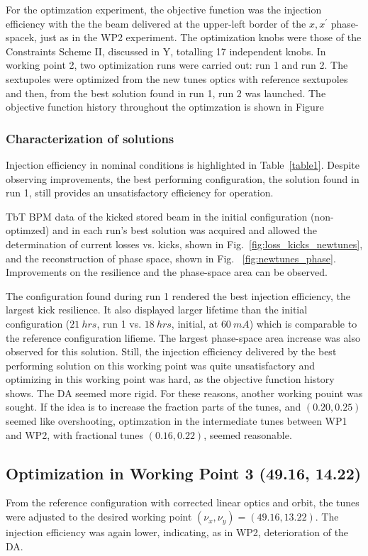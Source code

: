 For the optimzation experiment, the objective function was the injection efficiency with the the beam delivered at the upper-left border of the $x,x^\prime$ phase-spacek, just as in the WP2 experiment. The optimization knobs were those of the Constraints Scheme II, discussed in Y, totalling 17 independent knobs. In working point 2, two optimization runs were carried out: run 1 and run 2. The sextupoles were optimized from the new tunes optics with reference sextupoles and then, from the best solution found in run 1, run 2 was launched. The objective function history throughout the optimzation is shown in Figure
\subsubsection{Characterization of solutions}
Injection efficiency in nominal conditions is highlighted in Table~\ref{table1}. Despite observing improvements, the best performing configuration, the solution found in run 1, still provides an unsatisfactory efficiency for operation.

TbT BPM data of the kicked stored beam  in the initial configuration (non-optimzed) and in each run's best solution was acquired and allowed the determination of current losses vs. kicks, shown in Fig.~\ref{fig:loss_kicks_newtunes}, and the reconstruction of phase space, shown in Fig. ~\ref{fig:newtunes_phase}. Improvements on the resilience and the phase-space area can be observed.

The configuration found during run 1 rendered the best injection efficiency, the largest kick resilience. It also displayed larger lifetime than the initial configuration ($21~\unit{hrs}$, run 1 vs. $18~\unit{hrs}$, initial, at $60~\unit{mA}$) which is comparable to the reference configuration lifieme. The largest phase-space area increase was also observed for this solution. Still, the injection efficiency delivered by the best performing solution on this working point was quite unsatisfactory and optimizing in this working point was hard, as the objective function history shows. The DA seemed more rigid. For these reasons, another working pouint was sought. If the idea is to increase the fraction parts of the tunes, and $(0.20, 0.25)$ seemed like overshooting, optimzation in the intermediate tunes between WP1 and WP2, with fractional tunes $(0.16, 0.22)$, seemed reasonable.
\subsection{Optimization in Working Point 3 (49.16, 14.22)}
From the reference configuration with corrected linear optics and orbit, the tunes were adjusted to the desired working point $(\nu_x, \nu_y)=(49.16, 13.22)$. The injection efficiency was again lower, indicating, as in WP2, deterioration of the DA.

